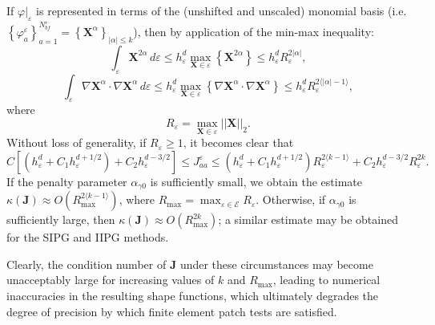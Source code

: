 If $\varphi|_{\varepsilon}$ is represented in terms of the (unshifted and unscaled) monomial basis (i.e. $\left\{ \varphi_a^\varepsilon \right\}_{a=1}^{N^\varepsilon_{bf}} = \left\{ \mathbf{X}^\alpha \right\}_{|\alpha| \leq k}$), then by application of the min-max inequality:
\begin{equation}
	\int_{\varepsilon} \mathbf{X}^{2\alpha} \, d \varepsilon \leq h_{\varepsilon}^d \max_{\mathbf{X} \in \varepsilon} \left\{ \mathbf{X}^{2\alpha} \right\} \leq h_{\varepsilon}^d R_{\varepsilon}^{2|\alpha|},
\end{equation}
\begin{equation}
	\int_{\varepsilon} \nabla \mathbf{X}^{\alpha} \cdot \nabla \mathbf{X}^{\alpha} \, d \varepsilon \leq h_{\varepsilon}^d \max_{\mathbf{X} \in \varepsilon} \left\{ \nabla \mathbf{X}^{\alpha} \cdot \nabla \mathbf{X}^{\alpha} \right\} \leq h_{\varepsilon}^d R_{\varepsilon}^{2\langle|\alpha|-1\rangle},
\end{equation}
where 
\begin{equation}
	R_\varepsilon = \max_{\mathbf{X} \in \varepsilon} || \mathbf{X} ||_2.
\end{equation}
Without loss of generality, if $R_\varepsilon \geq 1$, it becomes clear that
\begin{equation}
	C \left[ (h_\varepsilon^{d} + C_1 h_\varepsilon^{d+1/2}) + C_2 h_\varepsilon^{d-3/2} \right] \leq J^{\varepsilon}_{aa} \leq (h_\varepsilon^{d} + C_1 h_\varepsilon^{d+1/2}) R_{\varepsilon}^{2\langle k-1 \rangle} + C_2 h_\varepsilon^{d-3/2} R_{\varepsilon}^{2k}.
\end{equation}
If the penalty parameter $\alpha_{\gamma0}$ is sufficiently small, we obtain the estimate $\kappa (\mathbf{J}) \approx O(R_{\max}^{2\langle k-1 \rangle})$, where $R_{\max} = \max_{\varepsilon \in \mathcal{E}} R_\varepsilon$. Otherwise, if $\alpha_{\gamma0}$ is sufficiently large, then $\kappa (\mathbf{J}) \approx O(R_{\max}^{2k})$; a similar estimate may be obtained for the SIPG and IIPG methods.

Clearly, the condition number of $\mathbf{J}$ under these circumstances may become unacceptably large for increasing values of $k$ and $R_{\max}$, leading to numerical inaccuracies in the resulting shape functions, which ultimately degrades the degree of precision by which finite element patch tests are satisfied.

